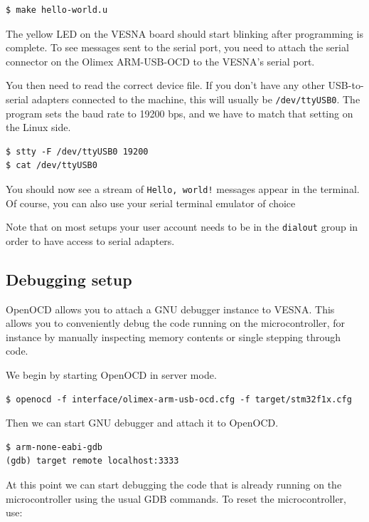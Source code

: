 \documentclass[a4paper, 10pt]{article}
\begin{document}
\begin{verbatim}
$ make hello-world.u
\end{verbatim}

The yellow LED on the VESNA board should start blinking after programming is complete.
To see messages sent to the serial port, you need to attach the serial
connector on the Olimex ARM-USB-OCD to the VESNA's serial port.

You then need to read the correct device file. If you don't have any
other USB-to-serial adapters connected to the machine, this will usually be
\verb|/dev/ttyUSB0|. The program sets the baud rate to 19200 bps, and we have to
match that setting on the Linux side.

\begin{verbatim}
$ stty -F /dev/ttyUSB0 19200
$ cat /dev/ttyUSB0
\end{verbatim}

You should now see a stream of \verb|Hello, world!| messages appear in the
terminal. Of course, you can also use your serial terminal emulator of choice

Note that on most setups your user account needs to be in the
\verb|dialout| group in order to have access to serial adapters.

\subsection{Debugging setup}

OpenOCD allows you to attach a GNU debugger instance to VESNA. This allows you
to conveniently debug the code running on the microcontroller, for instance by
manually inspecting memory contents or single stepping through code.

We begin by starting OpenOCD in server mode.

\begin{verbatim}
$ openocd -f interface/olimex-arm-usb-ocd.cfg -f target/stm32f1x.cfg
\end{verbatim}

Then we can start GNU debugger and attach it to OpenOCD.

\begin{verbatim}
$ arm-none-eabi-gdb
(gdb) target remote localhost:3333
\end{verbatim}

At this point we can start debugging the code that is already running on the
microcontroller using the usual GDB commands. To reset the microcontroller, use:
\end{document}
